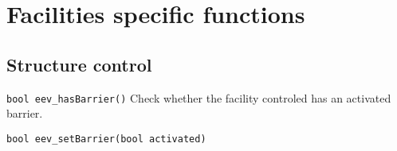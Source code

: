 \documentclass[10pt,a4paper]{scrartcl}
\newenvironment{apiCode}[1]
{ \begin{lrbox}{\mybox} \begin{minipage}{0.9\textwidth} {\texttt{#1}} \vspace{8pt} \newline }
{ \end{minipage} \end{lrbox}\fbox{\usebox{\mybox}} \newline\vspace{4pt}\newline }
\begin{document}
\newpage
\section{Facilities specific functions}
\subsection{Structure control}
\begin{apiCode}{bool eev_hasBarrier()}
Check whether the facility controled has an activated barrier.
\end{apiCode}
\begin{apiCode}{bool eev_setBarrier(bool activated)}
\end{apiCode}
\end{document}
